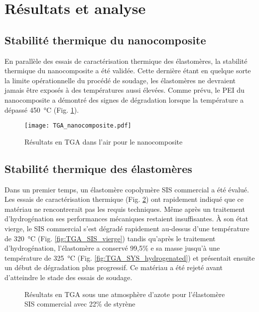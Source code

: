 \FloatBarrier
\section{Résultats et analyse}

\subsection{Stabilité thermique du nanocomposite}

En parallèle des essais de caractérisation thermique des élastomères, la stabilité thermique du nanocomposite a été validée. 
Cette dernière étant en quelque sorte la limite opérationnelle du procédé de soudage, les élastomères ne devraient jamais être exposés à des températures aussi élevées. 
Comme prévu, le PEI du nanocomposite a démontré des signes de dégradation lorsque la température a dépassé \SI{450}{\celsius} (Fig. \ref{fig:TGA_nanocomposite}). 

\begin{figure}[htb]
	\centering
	\texttt{[image: TGA\_nanocomposite.pdf]}
	\caption{Résultats en TGA dans l'air pour le nanocomposite}
	\label{fig:TGA_nanocomposite}
\end{figure}

\FloatBarrier
\subsection{Stabilité thermique des élastomères}

Dans un premier temps, un élastomère copolymère SIS commercial a été évalué. 
Les essais de caractérisation thermique (Fig. \ref{fig:TGA_SIS}) ont rapidement indiqué que ce matériau ne rencontrerait pas les requis techniques. 
Même après un traitement d'hydrogénation ses performances mécaniques restaient insuffisantes. 
À son état vierge, le SIS commercial s'est dégradé rapidement au-dessus d'une température de \SI{320}{\celsius} (Fig. \ref{fig:TGA_SIS_vierge}) tandis qu'après le traitement d'hydrogénation, l'élastomère a conservé 99,5\% e sa masse jusqu'à une température de \SI{325}{\celsius} (Fig. \ref{fig:TGA_SYS_hydrogenated}) et présentait ensuite un début de dégradation plus progressif.  
Ce matériau a été rejeté avant d'atteindre le stade des essais de soudage. 

\begin{figure}[h]
	\centering
	\qquad
	\caption{Résultats en TGA sous une atmosphère d'azote pour l'élastomère SIS commercial avec 22\% de styrène}
	\label{fig:TGA_SIS}
\end{figure}


